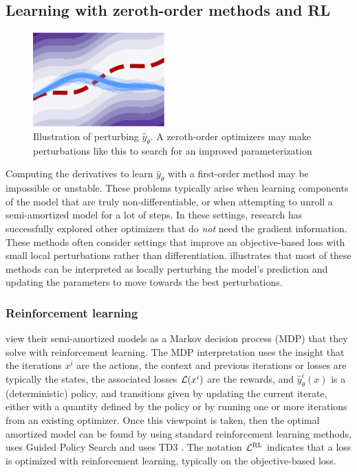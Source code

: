 \subsection{Learning with zeroth-order methods
  and RL}
\label{sec:learning:rl}

\begin{figure}[t]
\centering
\includegraphics[width=2in]{fig/learning-rl.pdf}
\caption{Illustration of perturbing $\hat y_\theta$.
  A zeroth-order optimizers may make perturbations
  like this to search for an improved parameterization
}
\label{fig:perturbing}
\end{figure}

Computing the derivatives to learn $\hat y_\theta$ with a
first-order method may be impossible or unstable.
These problems typically arise when learning components
of the model that are truly non-differentiable, or
when attempting to unroll a semi-amortized model for
a lot of steps.
In these settings, research has successfully explored
other optimizers that do \emph{not} need the gradient information.
These methods often consider settings that improve
an objective-based loss with small local perturbations
rather than differentiation.
 illustrates that most of these
methods can be interpreted as locally perturbing the
model's prediction and updating the parameters to
move towards the best perturbations.

\subsubsection{Reinforcement learning}
\citet{li2016learning,li2017learning,ichnowski2021accelerating} view their
semi-amortized models as a Markov decision process (MDP)
that they solve with reinforcement learning.
The MDP interpretation uses the insight
that the iterations $x^i$ are the actions,
the context and previous iterations or losses are typically the states,
the associated losses ${\mathcal{L}}(x^i)$ are the rewards,
and $\hat y_\theta^i(x)$ is a (deterministic) policy,
and transitions given by updating the current iterate,
either with a quantity defined by the policy or by running
one or more iterations from an existing optimizer.
Once this viewpoint is taken, then the optimal amortized model
can be found by using standard reinforcement learning methods,
\eg \citet{li2016learning,li2017learning} uses Guided Policy Search \citep{levine2013guided}
and \citet{ichnowski2021accelerating} uses TD3 \citep{fujimoto2018td3}.
The notation ${\mathcal{L}}^{\rm RL}$ indicates that a loss is optimized with reinforcement learning,
typically on the objective-based loss.

